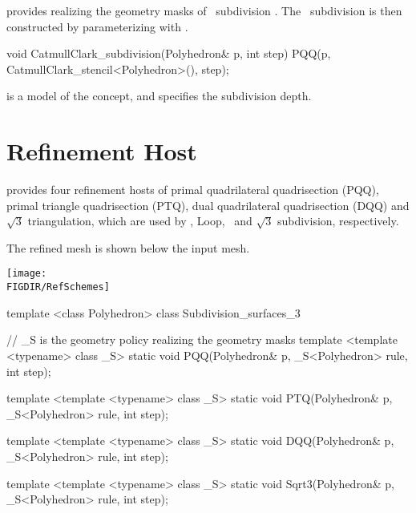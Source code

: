  provides  
realizing the geometry masks of \CC\ subdivision \cite{cgal:cc-rgbss-78}. 
The \CC\ subdivision is then constructed by parameterizing 
 with 
.

\begin{ccExampleCode}
  void CatmullClark_subdivision(Polyhedron& p, int step) {
    PQQ(p, CatmullClark_stencil<Polyhedron>(), step);
  }
\end{ccExampleCode}

 is a model of the 
concept, and  specifies the subdivision depth.


\section{Refinement Host}
 provides four refinement hosts of primal 
quadrilateral quadrisection (PQQ), primal triangle 
quadrisection (PTQ), dual quadrilateral 
quadrisection (DQQ) and $\sqrt{3}$ triangulation, which 
are used by \CC, Loop, \DS\ and $\sqrt{3}$ subdivision, 
respectively. 

The refined mesh is shown below the input mesh.
\begin{ccTexOnly}
  \begin{center}
    \parbox{0.6\textwidth}{%
      \texttt{[image: \\FIGDIR/RefSchemes]}%
    }
  \end{center}
\end{ccTexOnly}



\begin{ccExampleCode}
template <class Polyhedron>
class Subdivision_surfaces_3 {
  // _S is the geometry policy realizing the geometry masks
  template <template <typename> class _S>
  static void PQQ(Polyhedron& p, _S<Polyhedron> rule, int step);

  template <template <typename> class _S>
  static void PTQ(Polyhedron& p, _S<Polyhedron> rule, int step);

  template <template <typename> class _S>
  static void DQQ(Polyhedron& p, _S<Polyhedron> rule, int step);

  template <template <typename> class _S>
  static void Sqrt3(Polyhedron& p, _S<Polyhedron> rule, int step);
}
\end{ccExampleCode}


